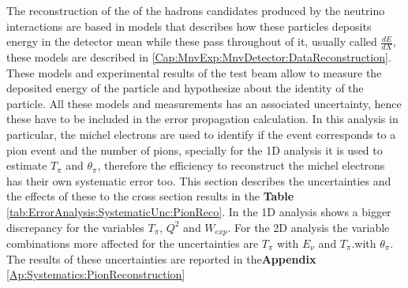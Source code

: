 The reconstruction of the of the hadrons candidates produced by the neutrino interactions are based in models that describes how these particles deposits energy in the detector mean while these pass throughout of it, usually called $\frac{dE}{dX}$, these models are described in \ref{Cap:MnvExp:MnvDetector:DataReconstruction}. These models and experimental results of the test beam allow to measure the deposited energy of the particle and hypothesize about the identity of the particle. All these models and measurements has an associated uncertainty, hence these have to be included in the error propagation calculation. In this analysis in particular, the michel electrons are used to identify if the event corresponds to a pion event and the number of pions, specially for the 1D analysis it is used to estimate $T_\pi$ and $\theta_\pi$, therefore the efficiency to reconstruct the michel electrons has their own  systematic error too. This section describes the uncertainties and the effects of these to the cross section results in the \textbf{Table} \ref{tab:ErrorAnalysis:SystematicUnc:PionReco}. In the 1D analysis shows a bigger discrepancy for the variables $T_\pi$, $Q^2$ and $W_{exp}$. For the 2D analysis the variable combinations more affected for the uncertainties are $T_\pi$ with $E_\nu$ and $T_\pi$.with $\theta_\pi$. The results of these uncertainties are reported in the\textbf{Appendix} \ref{Ap:Systematics:PionReconstruction}

